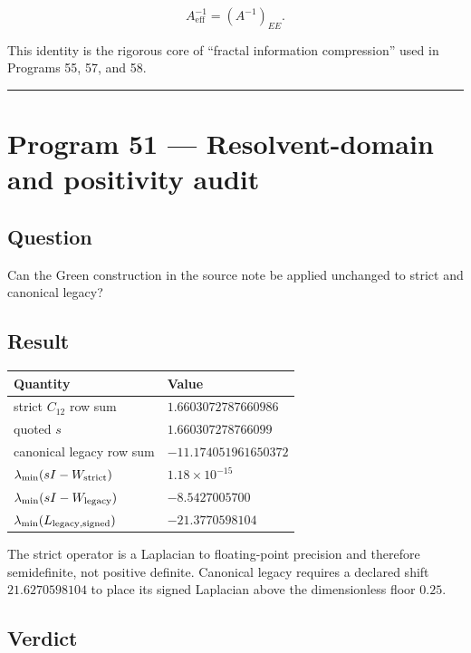 \documentclass[11pt,a4paper,openany]{report}
\begin{document}
\[
A_{\mathrm{eff}}^{-1}=(A^{-1})_{EE}.
\]

This identity is the rigorous core of “fractal information compression” used in Programs 55, 57, and 58.

\par\medskip\hrule\medskip

\chapter{Program 51 — Resolvent-domain and positivity audit}

\section{Question}

Can the Green construction in the source note be applied unchanged to strict and canonical legacy?

\section{Result}

\begin{center}
\begingroup\small
\setlength{\tabcolsep}{3.5pt}
\renewcommand{\arraystretch}{1.16}
\begin{longtable}{@{}p{}p{}@{}}
\toprule
\textbf{Quantity} & \textbf{Value} \\
\midrule
\endhead
strict \(C_{12}\) row sum & \(1.6603072787660986\) \\
quoted \(s\) & \(1.660307278766099\) \\
canonical legacy row sum & \(-11.174051961650372\) \\
\(\lambda_{\min}(sI-W_{\rm strict})\) & \(1.18\times10^{-15}\) \\
\(\lambda_{\min}(sI-W_{\rm legacy})\) & \(-8.5427005700\) \\
\(\lambda_{\min}(L_{\rm legacy,signed})\) & \(-21.3770598104\) \\
\bottomrule
\end{longtable}
\endgroup
\end{center}

The strict operator is a Laplacian to floating-point precision and therefore semidefinite, not positive definite. Canonical legacy requires a declared shift \(21.6270598104\) to place its signed Laplacian above the dimensionless floor \(0.25\).

\section{Verdict}
\end{document}
